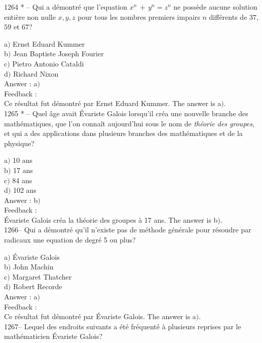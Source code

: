 ﻿\documentclass[letterpaper, 12pt]{article}
\begin{document}
1264 * -- Qui a d\'emontr\'e que l'equation $x^n\,+\,y^n=z^n$ ne
poss\`ede aucune solution enti\`ere non nulle $x,y,z$ pour tous les
nombres premiers impairs $n$ diff\'erents de $37$, $59$ et $67$?

a$)$ Ernst Eduard Kummer \\
b$)$ Jean Baptiste Joseph Fourier \\
c$)$ Pietro Antonio Cataldi \\
d$)$ Richard Nixon\\

Answer : a$)$\\

Feedback : \\
Ce r\'esultat fut d\'emontr\'e par Ernst Eduard Kummer.
The answer is a$)$.\\

1265 * -- Quel \^age avait \'Evariste Galois lorsqu'il cr\'ea une
nouvelle branche des math\'ematiques, que l'on conna\^it aujourd'hui
sous le nom de {\sl th\'eorie des groupes}, et qui a des
applications dans plusieurs branches des math\'ematiques et de la
physique?

a$)$ 10 ans \\
b$)$ 17 ans \\
c$)$ 84 ans \\
d$)$ 102 ans\\

Answer : b$)$\\

Feedback : \\
\'Evariste Galois cr\'ea la th\'eorie des groupes \`a 17 ans.
The answer is b$)$.\\

1266-- Qui a d\'emontr\'e qu'il n'existe pas de m\'ethode
g\'en\'erale pour r\'esoudre par radicaux une equation de degr\'e
5 ou plus?

a$)$ \'Evariste Galois \\
b$)$ John Machin \\
c$)$ Margaret Thatcher \\
d$)$ Robert Recorde\\

Answer : a$)$\\

Feedback : \\
Ce r\'esultat fut d\'emontr\'e par \'Evariste Galois.
The answer is a$)$.\\

1267-- Lequel des endroits suivants a \'et\'e fr\'equent\'e \`a
plusieurs reprises par le math\'ematicien \'Evariste Galois?
\end{document}
